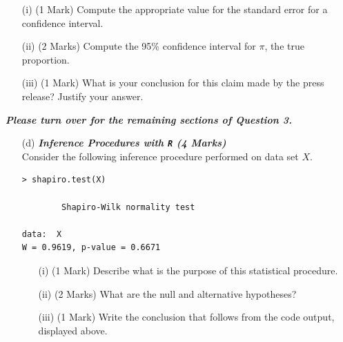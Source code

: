 \documentclass[a4paper,12pt]{article}
\begin{document}
\begin{itemize}
\begin{itemize}
\item[(i)] (1 Mark) Compute the appropriate value for the standard error for a confidence interval.
\item[(ii)] (2 Marks) Compute the 95\% confidence interval for $\pi$, the true proportion.
\item[(iii)] (1 Mark) What is your conclusion for this claim made by the press release? Justify your answer.
\end{itemize}
\end{itemize}
{
\normalsize
\textit{\textbf{Please turn over for the remaining sections of Question 3.}}
}
%
\newpage
\begin{itemize}
\item[(d)] \textbf{\textit{ Inference Procedures with \texttt{R} (4 Marks)}}\\
Consider the following inference procedure performed on data set $X$.
\begin{center}
\begin{framed}
\begin{verbatim}
> shapiro.test(X)

        Shapiro-Wilk normality test

data:  X
W = 0.9619, p-value = 0.6671

\end{verbatim}
\end{framed}
\end{center}

\begin{itemize}
\item[(i)] (1 Mark) Describe what is the purpose of this statistical procedure.
\item[(ii)] (2 Marks) What are the null and alternative hypotheses?
\item[(iii)] (1 Mark) Write the conclusion that follows from the code output, displayed above.
\end{itemize}
\end{itemize}
\end{document}
